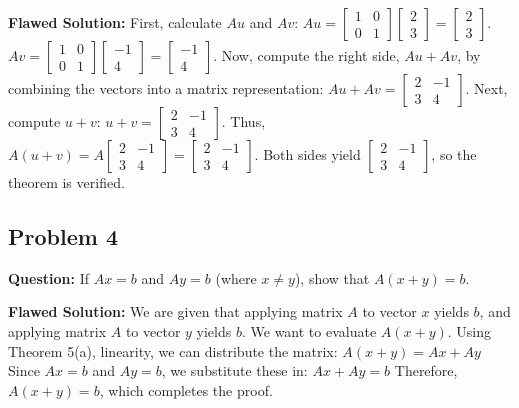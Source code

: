 \documentclass{article}
\begin{document}
\textbf{Flawed Solution:}
First, calculate $Au$ and $Av$:
$Au = \begin{bmatrix} 1 & 0 \\ 0 & 1 \end{bmatrix} \begin{bmatrix} 2 \\ 3 \end{bmatrix} = \begin{bmatrix} 2 \\ 3 \end{bmatrix}$.
$Av = \begin{bmatrix} 1 & 0 \\ 0 & 1 \end{bmatrix} \begin{bmatrix} -1 \\ 4 \end{bmatrix} = \begin{bmatrix} -1 \\ 4 \end{bmatrix}$.
Now, compute the right side, $Au + Av$, by combining the vectors into a matrix representation:
$Au + Av = \begin{bmatrix} 2 & -1 \\ 3 & 4 \end{bmatrix}$.
Next, compute $u+v$:
$u+v = \begin{bmatrix} 2 & -1 \\ 3 & 4 \end{bmatrix}$.
Thus, $A(u+v) = A \begin{bmatrix} 2 & -1 \\ 3 & 4 \end{bmatrix} = \begin{bmatrix} 2 & -1 \\ 3 & 4 \end{bmatrix}$.
Both sides yield $\begin{bmatrix} 2 & -1 \\ 3 & 4 \end{bmatrix}$, so the theorem is verified.

\subsection{Problem 4}
\textbf{Question:} If $Ax = b$ and $Ay = b$ (where $x \neq y$), show that $A(x+y) = b$.

\textbf{Flawed Solution:}
We are given that applying matrix $A$ to vector $x$ yields $b$, and applying matrix $A$ to vector $y$ yields $b$.
We want to evaluate $A(x+y)$. 
Using Theorem 5(a), linearity, we can distribute the matrix:
$A(x+y) = Ax + Ay$
Since $Ax = b$ and $Ay = b$, we substitute these in:
$Ax + Ay = b$
Therefore, $A(x+y) = b$, which completes the proof.
\end{document}
